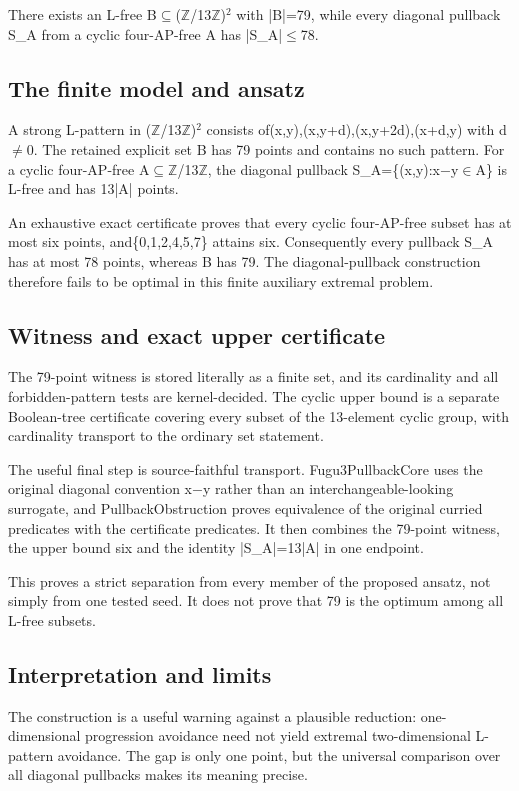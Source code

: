 \documentclass[11pt,a4paper]{article}
\begin{document}
There exists an L-free B\ensuremath{\subseteq}(\ensuremath{\mathbb{Z}}/13\ensuremath{\mathbb{Z}})\ensuremath{^2} with |B|=79, while every diagonal pullback S\_A from a cyclic four-AP-free A has |S\_A|\ensuremath{\leq}78.

\subsection{The finite model and ansatz}
A strong L-pattern in (\ensuremath{\mathbb{Z}}/13\ensuremath{\mathbb{Z}})\ensuremath{^2} consists of(x,y),(x,y+d),(x,y+2d),(x+d,y) with d\ensuremath{\neq}0. The retained explicit set B has 79 points and contains no such pattern. For a cyclic four-AP-free A\ensuremath{\subseteq}\ensuremath{\mathbb{Z}}/13\ensuremath{\mathbb{Z}}, the diagonal pullback S\_A=\{(x,y):x\ensuremath{-}y\ensuremath{\in}A\} is L-free and has 13|A| points.

An exhaustive exact certificate proves that every cyclic four-AP-free subset has at most six points, and\{0,1,2,4,5,7\} attains six. Consequently every pullback S\_A has at most 78 points, whereas B has 79. The diagonal-pullback construction therefore fails to be optimal in this finite auxiliary extremal problem.

\subsection{Witness and exact upper certificate}
The 79-point witness is stored literally as a finite set, and its cardinality and all forbidden-pattern tests are kernel-decided. The cyclic upper bound is a separate Boolean-tree certificate covering every subset of the 13-element cyclic group, with cardinality transport to the ordinary set statement.

The useful final step is source-faithful transport. Fugu3PullbackCore uses the original diagonal convention x\ensuremath{-}y rather than an interchangeable-looking surrogate, and PullbackObstruction proves equivalence of the original curried predicates with the certificate predicates. It then combines the 79-point witness, the upper bound six and the identity |S\_A|=13|A| in one endpoint.

This proves a strict separation from every member of the proposed ansatz, not simply from one tested seed. It does not prove that 79 is the optimum among all L-free subsets.

\subsection{Interpretation and limits}
The construction is a useful warning against a plausible reduction: one-dimensional progression avoidance need not yield extremal two-dimensional L-pattern avoidance. The gap is only one point, but the universal comparison over all diagonal pullbacks makes its meaning precise.
\end{document}
